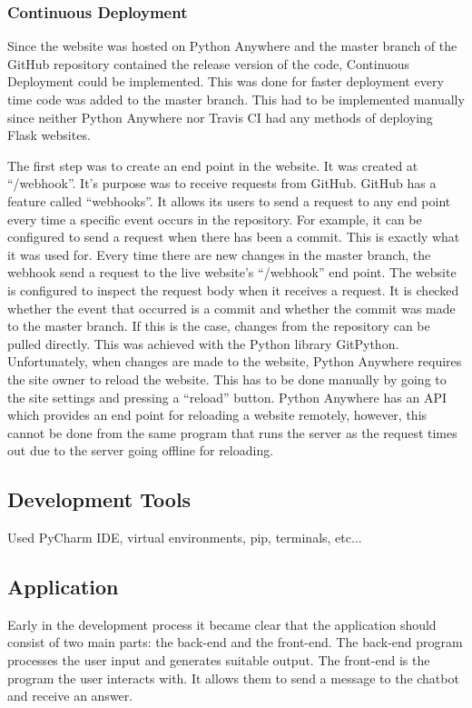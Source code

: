 \documentclass[12pt,a4paper]{article}
\begin{document}
\subsubsection{Continuous Deployment}
Since the website was hosted on Python Anywhere and the master branch of the GitHub repository contained the release version of the code, Continuous Deployment could be implemented. This was done for faster deployment every time code was added to the master branch. This had to be implemented manually since neither Python Anywhere nor Travis CI had any methods of deploying Flask websites. 

The first step was to create an end point in the website. It was created at “/webhook”. It’s purpose was to receive requests from GitHub. GitHub has a feature called “webhooks”. It allows its users to send a request to any end point every time a specific event occurs in the repository. For example, it can be configured to send a request when there has been a commit. This is exactly what it was used for. Every time there are new changes in the master branch, the webhook send a request to the live website’s “/webhook” end point. The website is configured to inspect the request body when it receives a request. It is checked whether the event that occurred is a commit and whether the commit was made to the master branch. If this is the case, changes from the repository can be pulled directly. This was achieved with the Python library GitPython. Unfortunately, when changes are made to the website, Python Anywhere requires the site owner to reload the website. This has to be done manually by going to the site settings and pressing a \enquote{reload} button. Python Anywhere has an API which provides an end point for reloading a website remotely, however, this cannot be done from the same program that runs the server as the request times out due to the server going offline for reloading. 

\subsection{Development Tools}
Used PyCharm IDE, virtual environments, pip, terminals, etc...

\subsection{Application}
Early in the development process it became clear that the application should consist of two main parts: the back-end and the front-end. The back-end program processes the user input and generates suitable output. The front-end is the program the user interacts with. It allows them to send a message to the chatbot and receive an answer.
\end{document}

